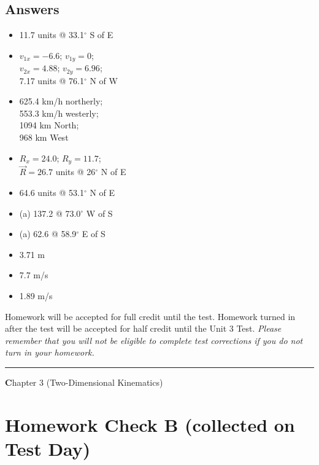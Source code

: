 \documentclass[10pt]{exam}
\def\mytitle{Chapter 3 (Two-Dimensional Kinematics)}
\def\mymaketitle{
  \begin{flushleft}
    {\LARGE \textbf \mytitle \par}
  \end{flushleft}
}
\begin{document}
\subsection*{Answers}

\begin{multicols}{3}

  \begin{itemize}[noitemsep]
    \item[3.] 11.7 units @ 33.1$^\circ$ S of E
    \item[6.]  $v_{1x} = -6.6$;  $v_{1y} = 0$; \\
       $v_{2x} = 4.88$;   $v_{2y} = 6.96$; \\
       7.17 units @ 76.1$^\circ$ N of W
    \item[8.] 625.4 km/h northerly; \\
       553.3 km/h westerly; \\
       1094 km North; \\
       968 km West
    \item[9.] $R_x = 24.0$;  $R_y = 11.7$;  \\
       $\vec{R} = 26.7$ units @ 26$^\circ$ N of E
    \item[11.] 64.6 units @ 53.1$^\circ$ N of E
    \item[12.] (a) 137.2 @ 73.0$^\circ$ W of S
    \item[13.] (a) 62.6 @ 58.9$^\circ$ E of S
    \item[17.] 3.71 m
    \item[20.] 7.7 m/s
    \item[22.] 1.89 m/s
    
  \end{itemize}
  
\end{multicols}

\noindent
{\footnotesize Homework will be accepted for full credit until the test.
Homework turned in after the test will be accepted for half credit
until the Unit 3 Test.
\emph{Please remember that you will not be eligible to complete 
test corrections if you do not turn in your homework.}}

\vspace{1em}
\hrule 



\pagebreak

\mymaketitle

\section*{Homework Check B (collected on Test Day)}
\end{document}
